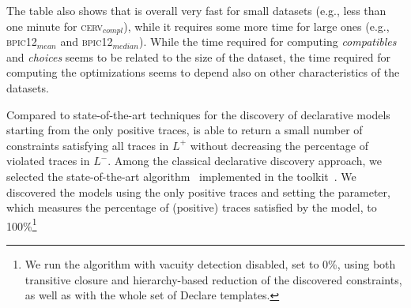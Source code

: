 The table also shows that \nd is overall very fast for small datasets (e.g., less than one minute for \textsc{cerv$_{compl}$}), while it requires some more time for large ones (e.g., \textsc{bpic12$_{mean}$} and \textsc{bpic12$_{median}$}). While the time required for computing \textit{compatibles} and \textit{choices} seems to be related to the size of the dataset, the time required for computing the optimizations seems to depend also on other characteristics of the datasets. 



Compared to state-of-the-art techniques for the discovery of declarative models starting from the only positive traces, \nd is able to return a small number of constraints satisfying all traces in $L^+$ without decreasing the percentage of violated traces in $L^-$.  
Among the classical declarative discovery approach, we selected the state-of-the-art \declareminer algorithm~\cite{2018a-Maggi} implemented in the \rum toolkit~\cite{2020-Alman}. We discovered the models using the only positive traces and setting the  parameter, which measures the percentage of (positive) traces satisfied by the \declare model, to 100\%\footnote{We run the \declareminer algorithm with vacuity detection disabled,  set to 0\%, using both transitive closure and hierarchy-based reduction of the discovered constraints, as well as with the whole set of Declare templates.}

